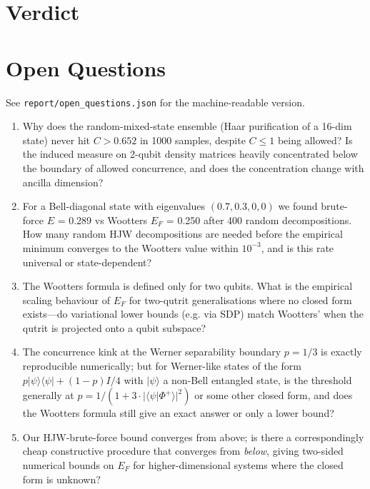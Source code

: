 \documentclass[11pt]{article}
\begin{document}
\section{Verdict}
\noindent{}

\section*{Open Questions}
See \texttt{report/open\_questions.json} for the machine-readable version.

\begin{enumerate}
\item[Q1.] Why does the random-mixed-state ensemble (Haar purification
of a 16-dim state) never hit $C > 0.652$ in 1000 samples, despite $C
\le 1$ being allowed? Is the induced measure on 2-qubit density
matrices heavily concentrated below the boundary of allowed
concurrence, and does the concentration change with ancilla dimension?
\item[Q2.] For a Bell-diagonal state with eigenvalues $(0.7, 0.3, 0, 0)$
we found brute-force $E$ = 0.289 vs Wootters $E_F$ = 0.250 after 400
random decompositions. How many random HJW decompositions are needed
before the empirical minimum converges to the Wootters value within
$10^{-3}$, and is this rate universal or state-dependent?
\item[Q3.] The Wootters formula is defined only for two qubits. What
is the empirical scaling behaviour of $E_F$ for two-qutrit
generalisations where no closed form exists—do variational lower bounds
(e.g. via SDP) match Wootters' when the qutrit is projected onto a
qubit subspace?
\item[Q4.] The concurrence kink at the Werner separability boundary
$p=1/3$ is exactly reproducible numerically; but for
Werner-like states of the form $p |\psi\rangle\!\langle\psi| + (1-p)I/4$
with $|\psi\rangle$ a non-Bell entangled state, is the threshold
generally at $p = 1/(1+3\cdot|\langle\psi|\Phi^+\rangle|^2)$ or some
other closed form, and does the Wootters formula still give an exact
answer or only a lower bound?
\item[Q5.] Our HJW-brute-force bound converges from above; is there a
correspondingly cheap constructive procedure that converges from
\emph{below}, giving two-sided numerical bounds on $E_F$ for
higher-dimensional systems where the closed form is unknown?
\end{enumerate}
\end{document}

